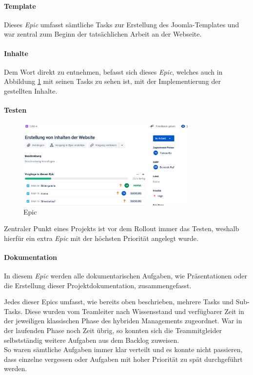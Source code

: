 \documentclass[12pt,a4paper]{article}
\begin{document}
\paragraph{Template} Dieses \textit{Epic} umfasst sämtliche Tasks zur Erstellung des Joomla-Templates und war zentral zum Beginn der tatsächlichen Arbeit an der Webseite.
\paragraph{Inhalte} Dem Wort direkt zu entnehmen, befasst sich dieses \textit{Epic}, welches auch in Abbildung \ref{img:Epic} mit seinen Tasks zu sehen ist, mit der Implementierung der gestellten Inhalte.

\paragraph{Testen} 
\begin{figure}
  \includegraphics[width=9cm]{Epic.png}
  \caption{Epic}
  \label{img:Epic}
\end{figure}
Zentraler Punkt eines Projekts ist vor dem Rollout immer das Testen, weshalb hierfür ein extra \textit{Epic} mit der höchsten Priorität angelegt wurde.
\paragraph{Dokumentation} In diesem \textit{Epic} werden alle dokumentarischen Aufgaben, wie Präsentationen oder die Erstellung dieser Projektdokumentation, zusammengefasst.\\
\par\smallskip
Jedes dieser Epics umfasst, wie bereits oben beschrieben, mehrere Tasks und Sub-Tasks. Diese wurden vom Teamleiter nach Wissensstand und verfügbarer Zeit in der jeweiligen klassischen Phase des hybriden Managements zugeordnet. War in der laufenden Phase noch Zeit übrig, so konnten sich die Teammitgleider selbstständig weitere Aufgaben aus dem Backlog zuweisen.\\
So waren sämtliche Aufgaben immer klar verteilt und es konnte nicht passieren, dass einzelne vergessen oder Aufgaben mit hoher Priorität zu spät durchgeführt werden.
\end{document}

